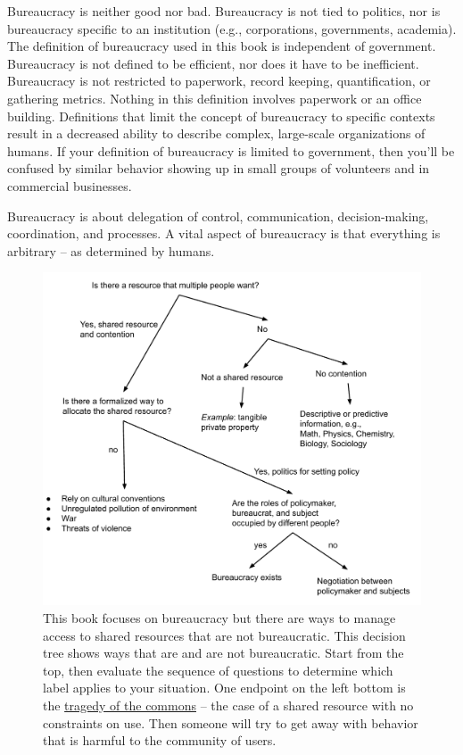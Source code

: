 Bureaucracy is neither good nor bad. Bureaucracy is not tied to politics, nor is bureaucracy specific to an institution (e.g., corporations, governments, academia). The definition of bureaucracy used in this book is independent of government. Bureaucracy is not defined to be efficient, nor does it have to be inefficient. Bureaucracy is not restricted to paperwork, record keeping, quantification, or gathering metrics. Nothing in this definition involves paperwork or an office building. Definitions that limit the concept of bureaucracy to specific contexts result in a decreased ability to describe complex, large-scale organizations of humans. If your definition of bureaucracy is limited to government, then you'll be confused by similar behavior showing up in small groups of volunteers and in commercial businesses.

Bureaucracy is about delegation of control, communication, decision-making, coordination, and processes. 
A vital aspect of bureaucracy is that everything is arbitrary -- as determined by humans.



\begin{figure}
    \centering
    \includegraphics[width=1.05\textwidth]{images/relation_between_shared_resource_and_bureaucarcy.pdf}
    \caption{This book focuses on bureaucracy but there are ways to manage access to shared resources that are not bureaucratic.  
    This decision tree shows ways that are and are not bureaucratic. Start from the top, then evaluate the sequence of questions to determine which label applies to your situation.
    One endpoint on the left bottom is 
    the 
    \href{https://en.wikipedia.org/wiki/Tragedy_of_the_commons}{tragedy of the commons}  
    -- the case of a shared resource with no constraints on use. Then someone will try to get away with behavior that is harmful to the community of users. }
    \label{fig:am-I-a-bureaucrat}
\end{figure}

